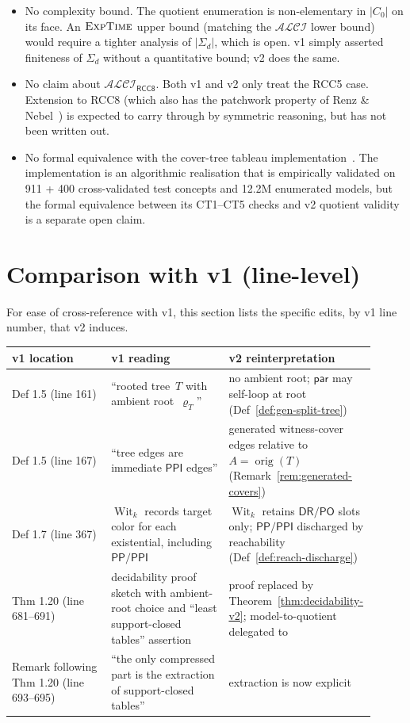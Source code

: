 \documentclass[11pt]{article}
\theoremstyle{definition}
\theoremstyle{remark}
\newcommand{\DR}{\mathsf{DR}}
\newcommand{\PO}{\mathsf{PO}}
\newcommand{\PP}{\mathsf{PP}}
\newcommand{\PPI}{\mathsf{PPI}}
\newcommand{\Wit}{\operatorname{Wit}}
\newcommand{\orig}{\operatorname{orig}}
\newcommand{\ALCIRCC}[1]{\mathcal{ALCI}_{\mathsf{RCC#1}}}
\begin{document}
\begin{itemize}
\item No complexity bound. The quotient enumeration is
  non-elementary in $|C_0|$ on its face. An $\textsc{ExpTime}$
  upper bound (matching the $\mathcal{ALCI}$ lower bound) would
  require a tighter analysis of $|\Sigma_d|$, which is open.
  v1 simply asserted finiteness of $\Sigma_d$ without a
  quantitative bound; v2 does the same.
\item No claim about $\ALCIRCC{8}$. Both v1 and v2 only treat the
  RCC5 case. Extension to RCC8 (which also has the patchwork
  property of Renz \& Nebel~\cite{RenzNebel}) is expected to
  carry through by symmetric reasoning, but has not been written
  out.
\item No formal equivalence with the cover-tree tableau
  implementation~\cite{ClaudeImpl}. The implementation is an
  algorithmic realisation that is empirically validated on
  911 + 400 cross-validated test concepts and 12.2M enumerated
  models, but the formal equivalence between its CT1--CT5 checks
  and v2 quotient validity is a separate open claim.
\end{itemize}

\section{Comparison with v1 (line-level)}
\label{sec:comparison}

For ease of cross-reference with v1, this section lists the
specific edits, by v1 line number, that v2 induces.

\begin{center}
\renewcommand{\arraystretch}{1.25}
\begin{tabular}{p{0.27\linewidth}p{0.32\linewidth}p{0.32\linewidth}}
\toprule
v1 location & v1 reading & v2 reinterpretation \\
\midrule
Def 1.5 (line 161) & ``rooted tree~$T$ with ambient root~$\varrho_T$'' &
no ambient root; $\mathsf{par}$ may self-loop at root
(Def~\ref{def:gen-split-tree}) \\
Def 1.5 (line 167) & ``tree edges are immediate $\PPI$ edges'' &
generated witness-cover edges relative to $A = \orig(T)$
(Remark~\ref{rem:generated-covers}) \\
Def 1.7 (line 367) & $\Wit_k$ records target color for each
existential, including $\PP/\PPI$ &
$\Wit_k$ retains $\DR/\PO$ slots only;
$\PP/\PPI$ discharged by reachability
(Def~\ref{def:reach-discharge}) \\
Thm 1.20 (line 681--691) & decidability proof sketch with
ambient-root choice and ``least support-closed tables'' assertion &
proof replaced by Theorem~\ref{thm:decidability-v2}; model-to-quotient
delegated to~\cite[Thm 12.1]{CompletenessV2} \\
Remark following Thm 1.20 (line 693--695) & ``the only compressed
part is the extraction of support-closed tables'' &
extraction is now explicit~\cite[\S 6, \S 9]{CompletenessV2} \\
\bottomrule
\end{tabular}
\end{center}
\end{document}
